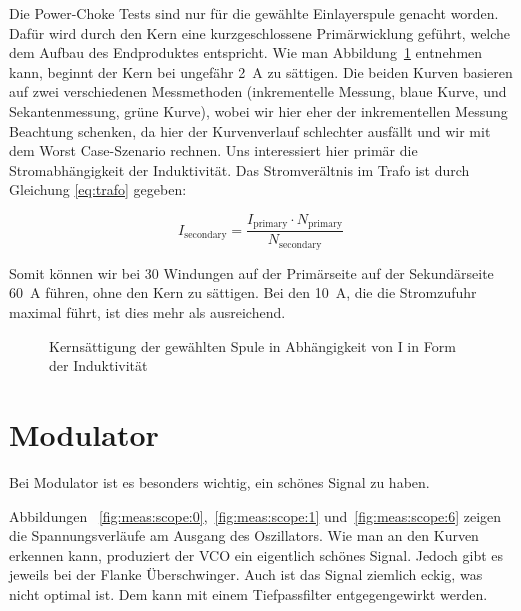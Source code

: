 Die  Power-Choke Tests  sind nur  f\"ur die  gew\"ahlte Einlayerspule  genacht
worden. Daf\"ur  wird durch  den Kern  eine kurzgeschlossene  Prim\"arwicklung
gef\"uhrt,   welche   dem   Aufbau  des   Endproduktes   entspricht. Wie   man
Abbildung~\ref{fig:meas:coupling:coil:power_choke:1}  entnehmen kann,  beginnt
der  Kern  bei ungef\"ahr  \SI{2}{\ampere}  zu  s\"attigen. Die beiden  Kurven
basieren   auf  zwei   verschiedenen   Messmethoden  (inkrementelle   Messung,
blaue  Kurve,  und  Sekantenmessung,  gr\"une  Kurve),  wobei  wir  hier  eher
der  inkrementellen  Messung Beachtung  schenken,  da  hier der  Kurvenverlauf
schlechter  ausf\"allt  und  wir  mit  dem  Worst  Case-Szenario  rechnen. Uns
interessiert hier prim\"ar die  Stromabh\"angigkeit der Induktivit\"at. Das
Stromver\"altnis im Trafo ist durch Gleichung \ref{eq:trafo} gegeben:

\begin{equation}\label{eq:trafo}
    I_{\mathrm{secondary}} = \frac{I_{\mathrm{primary}} \cdot N_{\mathrm{primary}}}{N_{\mathrm{secondary}}}
\end{equation}

Somit  k\"onnen   wir  bei  30   Windungen  auf  der  Prim\"arseite   auf  der
Sekund\"arseite \SI{60}{\ampere}  f\"uhren, ohne  den Kern  zu s\"attigen. Bei
den \SI{10}{\ampere}, die  die Stromzufuhr maximal f\"uhrt, ist  dies mehr als
ausreichend.

\begin{figure}[h!tb]
    \centering
    
    \caption[Messresultate Kopplungsspule: Kerns\"attigung \"uber Strom]{Kerns\"attigung der gew\"ahlten Spule in Abh\"angigkeit von I in Form der Induktivit\"at}
    \label{fig:meas:coupling:coil:power_choke:1}
\end{figure}


\clearpage
\section{Modulator}
\label{sec:val:modulator}

Bei Modulator ist es besonders wichtig, ein sch\"ones Signal zu haben.

Abbildungen                    ~\ref{fig:meas:scope:0},~\ref{fig:meas:scope:1}
und~\ref{fig:meas:scope:6}  zeigen  die  Spannungsverl\"aufe  am  Ausgang  des
Oszillators.   Wie  man  an  den  Kurven erkennen  kann,  produziert  der  VCO
ein  eigentlich  sch\"ones  Signal. Jedoch  gibt es  jeweils  bei  der  Flanke
\"Uberschwinger. Auch  ist  das  Signal  ziemlich  eckig,  was  nicht  optimal
ist. Dem kann mit einem Tiefpassfilter entgegengewirkt werden.

